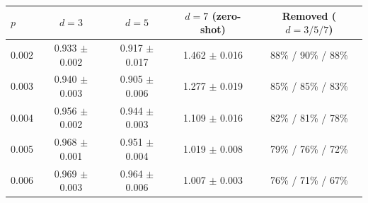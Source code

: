 \begin{tabular}{lcccc}
\toprule
$p$ & $d=3$ & $d=5$ & $d=7$ (zero-shot) & Removed ($d=3/5/7$) \\
\midrule
0.002 & 0.933 $\pm$ 0.002 & 0.917 $\pm$ 0.017 & 1.462 $\pm$ 0.016 & 88\% / 90\% / 88\% \\
0.003 & 0.940 $\pm$ 0.003 & 0.905 $\pm$ 0.006 & 1.277 $\pm$ 0.019 & 85\% / 85\% / 83\% \\
0.004 & 0.956 $\pm$ 0.002 & 0.944 $\pm$ 0.003 & 1.109 $\pm$ 0.016 & 82\% / 81\% / 78\% \\
0.005 & 0.968 $\pm$ 0.001 & 0.951 $\pm$ 0.004 & 1.019 $\pm$ 0.008 & 79\% / 76\% / 72\% \\
0.006 & 0.969 $\pm$ 0.003 & 0.964 $\pm$ 0.006 & 1.007 $\pm$ 0.003 & 76\% / 71\% / 67\% \\
\bottomrule
\end{tabular}
